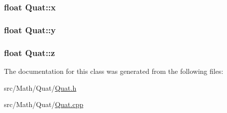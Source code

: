 \subsubsection[{\texorpdfstring{x}{x}}]{\setlength{\rightskip}{0pt plus 5cm}float Quat\+::x}\hypertarget{class_quat_a15db053bd6750a53e33bf30a0250c288}{}\label{class_quat_a15db053bd6750a53e33bf30a0250c288}
\subsubsection[{\texorpdfstring{y}{y}}]{\setlength{\rightskip}{0pt plus 5cm}float Quat\+::y}\hypertarget{class_quat_ac6045ee4149a978a4ce429c132e46fa2}{}\label{class_quat_ac6045ee4149a978a4ce429c132e46fa2}
\subsubsection[{\texorpdfstring{z}{z}}]{\setlength{\rightskip}{0pt plus 5cm}float Quat\+::z}\hypertarget{class_quat_a611fbb79f7b802da4f1c65a31c2c5fea}{}\label{class_quat_a611fbb79f7b802da4f1c65a31c2c5fea}


The documentation for this class was generated from the following files\+:\begin{DoxyCompactItemize}
\item 
src/\+Math/\+Quat/\hyperlink{_quat_8h}{Quat.\+h}\item 
src/\+Math/\+Quat/\hyperlink{_quat_8cpp}{Quat.\+cpp}\end{DoxyCompactItemize}
